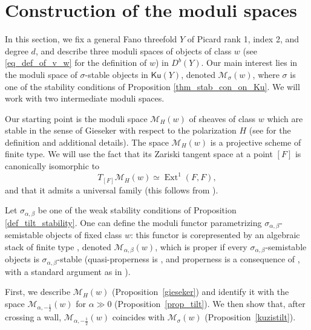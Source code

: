 \documentclass[11pt]{amsart}
\theoremstyle{definition}
\DeclareMathOperator{\Ext}{Ext}
\newcommand{\sM}{\mathcal{M}}
\newcommand{\Ku}{\mathsf{Ku}}
\begin{document}
\section{Construction of the moduli spaces}\label{sec_construction_of_moduli}

In this section, we fix a general Fano threefold $Y$ of Picard rank 1, index 2, and degree $d$, and describe three moduli spaces of objects of class $w$ (see \eqref{eq_def_of_v_w} for the definition of $w$) in $D^b(Y)$. Our main interest lies in the moduli space of $\sigma$-stable objects in $\Ku(Y)$, denoted $\sM_\sigma(w)$, where $\sigma$ is one of the stability conditions of Proposition \ref{thm_stab_con_on_Ku}. We will work with two intermediate moduli spaces. 

Our starting point is the moduli space $\sM_H(w)$ of sheaves of class $w$ which are stable in the sense of Gieseker with respect to the polarization $H$ (see \cite[Chapter 4]{HL10} for the definition and additional details). The space $\sM_H(w)$ is a projective scheme of finite type. We will use the fact that its Zariski tangent space at a point $[F]$ is canonically isomorphic to 
\begin{equation}\label{eq_Tangent_M_G}
    T_{[F]}\sM_H(w)\simeq \Ext^1(F,F), 
\end{equation}
and that it admits a universal family (this follows from \cite[Theorem 4.6.5]{HL10}).

Let $\sigma_{\alpha,\beta}$ be one of the weak stability conditions of Proposition \ref{def_tilt_stability}. One can define the moduli functor parametrizing $\sigma_{\alpha,\beta}$-semistable objects of fixed class $w$: this functor is corepresented by an algebraic stack of finite type \cite[Proposition~3.7]{Toda13_BG_counting}, denoted $\sM_{\alpha,\beta}(w)$, which is proper if every $\sigma_{\alpha,\beta}$-semistable objects is $\sigma_{\alpha,\beta}$-stable (quasi-properness is \cite[Theorem~1.2]{TP15}, and properness is a consequence of \cite{AP06}, with a standard argument as in \cite[Lemma 6.6]{BM14}). 

First, we describe $\sM_H(w)$ (Proposition~\ref{gieseker}) and identify it with the space $\sM_{\alpha,-\frac 12}(w)$ for $\alpha \gg 0$ (Proposition~\ref{prop_tilt}). We then show that, after crossing a wall, $\sM_{\alpha,-\frac 12}(w)$ coincides with $\sM_\sigma(w)$ (Proposition~\ref{kuzistilt}).




\end{document}
